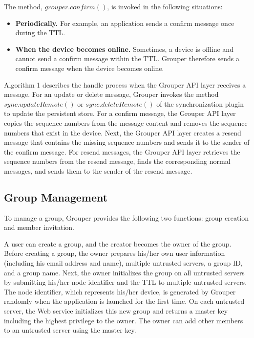 \documentclass{sig-alternate-05-2015}
\begin{document}
The method, $grouper.confirm()$, is invoked in the following situations:

\begin{itemize}[leftmargin=7mm]
	\setlength{\itemsep}{1pt}
	\setlength{\parskip}{0pt}
	\setlength{\parsep}{0pt}
	\item \textbf{Periodically.}
	For example, an application sends a confirm message once during the TTL.
	\item \textbf{When the device becomes online.} 
	Sometimes, a device is offline and cannot send a confirm message within the TTL.
	Grouper therefore sends a confirm message when the device becomes online.
\end{itemize}

Algorithm 1 describes the handle process when the Grouper API layer receives a message.
For an update or delete message, Grouper invokes the method $sync.updateRemote()$ or $sync.deleteRemote()$ of the synchronization plugin to update the persistent store.
For a confirm message, the Grouper API layer copies the sequence numbers from the message content and removes the sequence numbers that exist in the device.
Next, the Grouper API layer creates a resend message that contains the missing sequence numbers and sends it to the sender of the confirm message.
For resend messages, the Grouper API layer retrieves the sequence numbers from the resend message, finds the corresponding normal messages, and sends them to the sender of the resend message.

\subsection{Group Management}

To manage a group, Grouper provides the following two functions: group creation and member invitation.

A user can create a group, and the creator becomes the owner of the group.  
Before creating a group, the owner prepares his/her own user information (including his email address and name), multiple untrusted servers, a group ID, and a group name. 
Next, the owner initializes the group on all untrusted servers by submitting his/her node identifier and the TTL to multiple untrusted servers. 
The node identifier, which represents his/her device, is generated by Grouper randomly when the application is launched for the first time. 
On each untrusted server, the Web service initializes this new group and returns a master key including the highest privilege to the owner. 
The owner can add other members to an untrusted server using the master key.
\end{document}
